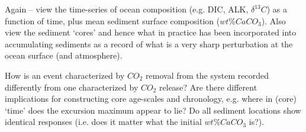 Again – view the time-series of ocean composition (e.g. DIC, ALK, \(\delta^{13} C\)) as a function of time, plus mean sediment surface composition (\(wt\% CaCO_{3}\)). Also view the sediment ‘cores’ and hence what in practice has been incorporated into accumulating sediments as a record of what is a very sharp perturbation at the ocean surface (and atmosphere).

How  is an event characterized by \(CO_{2}\) removal from the system recorded differently from one characterized by \(CO_{2}\) release? Are there different implications for constructing core age-scales and chronology, e.g. where in (core) ‘time’ does the excursion maximum appear to lie? Do all sediment locations show identical responses (i.e. does it matter what the initial \(wt\% CaCO_{3}\) is?).

